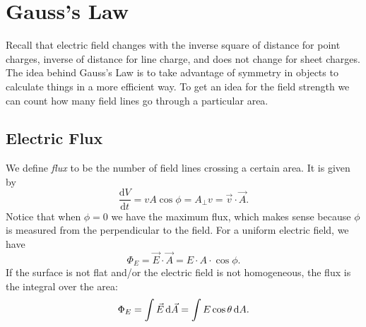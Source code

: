 \documentclass[class=article, crop=false]{standalone}
\begin{document}
  \section{Gauss's Law}
  Recall that electric field changes with the inverse square of distance for point charges, inverse of distance for line charge, and does not change for sheet charges. The idea behind Gauss's Law is to take advantage of symmetry in objects to calculate things in a more efficient way. To get an idea for the field strength we can count how many field lines go through a particular area.
  \subsection{Electric Flux}
  We define \emph{flux} to be the number of field lines crossing a certain area. It is given by
  \[
    \frac{\mathrm{d}V}{\mathrm{d}t} = vA\cos\phi = A_\perp v = \vec{v}\cdot\vec{A}.
  \]
  Notice that when $\phi = 0$ we have the maximum flux, which makes sense because $\phi$ is measured from the perpendicular to the field. For a uniform electric field, we have
  \[
    \Phi_E = \vec{E}\cdot \vec{A} = E\cdot A\cdot \cos\phi.
  \]
  If the surface is not flat and/or the electric field is not homogeneous, the flux is the integral over the area:
  \[
    \Phi_E = \int \vec{E} \,\mathrm{d}\vec{A} = \int E\cos\theta \,\mathrm{d}A.
  \]
\end{document}
